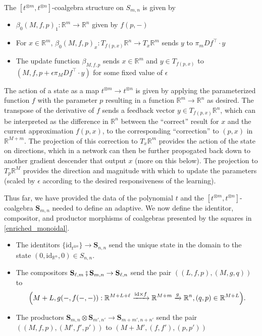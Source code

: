 \documentclass[11pt, one side, article]{memoir}
\theoremstyle{definition}
\theoremstyle{plain}
\newenvironment{definition}
  {\pushQED{\qed}\renewcommand{\qedsymbol}{$\lozenge$}\definitionx}
  {\popQED\enddefinitionx}
\newcommand{\Cat}[1]{\mathbf{#1}}%
\newcommand{\id}{\mathrm{id}}
\newcommand{\then}{\mathbin{\fatsemi}}
\newcommand{\To}[2][]{\xrightarrow[#1]{#2}}
\newcommand{\rr}{\mathbb{R}}
\newcommand{\0}{\textsf{0}}
\newcommand{\1}{\tn{\textsf{1}}}
\renewcommand{\S}{{\Cat{S}}}
\newcommand{\blp}{\Big{(}}
\newcommand{\brp}{\Big{)}}
\newcommand{\idcoalg}[1]{{\{\id_{#1}\}}}
\begin{document}
\begin{definition}
The $[t^{\otimes m},t^{\otimes n}]$-coalgebra structure on $S_{m,n}$ is given by 
\begin{itemize}
	\item $\beta_0(M,f,p)_1 : \rr^m \to \rr^n$ given by $f(p,-)$
	\item For $x \in \rr^m$, $\beta_0(M,f,p)_x : T_{f(p,x)} \rr^n \to T_x \rr^m$ sends $y$ to $\pi_m Df^\top \cdot y$
	\item The update function $\beta_{M,f,p}$ sends $x \in \rr^m$ and $y \in T_{f(p,x)}$ to $(M,f,p+\epsilon \pi_M Df^\top \cdot y)$ for some fixed value of $\epsilon$
\end{itemize}
\end{definition}

The action of a state as a map $t^{\otimes m} \to t^{\otimes n}$ is given by applying the parameterized function $f$ with the parameter $p$ resulting in a function $\rr^m \to \rr^n$ as desired. The transpose of the derivative of $f$ sends a feedback vector $y \in T_{f(p,x)} \rr^n$, which can be interpreted as the difference in $\rr^n$ between the ``correct'' result for $x$ and the current approximation $f(p,x)$, to the corresponding ``correction'' to $(p,x)$ in $\rr^{M+m}$. The projection of this correction to $T_x \rr^m$ provides the action of the state on directions, which in a network can then be further propogated back down to another gradient descender that output $x$ (more on this below). The projection to $T_p \rr^M$ provides the direction and magnitude with which to update the parameters (scaled by $\epsilon$ according to the desired responsiveness of the learning).

Thus far, we have provided the data of the polynomial $t$ and the $[t^{\otimes m},t^{\otimes n}]$-coalgebra $\S_{m,n}$ needed to define an adaptive. We now define the identitor, compositor, and productor morphisms of coalgebras presented by the squares in \cref{enriched_monoidal}.
\begin{itemize}
	\item The identitors $\idcoalg{t^{\otimes n}} \to \S_{n,n}$ send the unique state in the domain to the state $(0,\id_{\rr^n},0) \in S_{n,n}$. 
	\item The compositors $\S_{\ell,m}\then\S_{m,n} \to \S_{\ell,n}$ send the pair $((L,f,p),(M,g,q))$ to 
$$\blp M+L,g(-,f(-,-)) : \rr^{M+L+\ell} \To{\id \times f} \rr^{M+m} \To{g} \rr^n, (q,p) \in \rr^{M+L} \brp.$$
	\item The productors $\S_{m,n} \otimes \S_{m',n'} \to \S_{m+m',n+n'}$ send the pair $((M,f,p),(M',f',p'))$ to $(M+M',(f,f'),(p,p'))$
\end{itemize}
\end{document}
